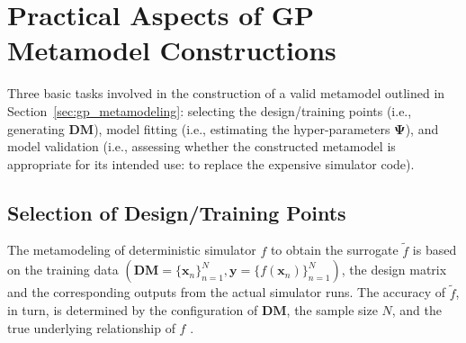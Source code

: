 \section{Practical Aspects of GP Metamodel Constructions}\label{sec:gp_construction}

Three basic tasks involved in the construction of a valid metamodel outlined in Section~\ref{sec:gp_metamodeling}:
selecting the design/training points (i.e., generating $\mathbf{DM}$),
model fitting (i.e., estimating the hyper-parameters $\boldsymbol{\Psi}$),
and model validation (i.e., assessing whether the constructed metamodel is appropriate for its intended use: to replace the expensive simulator code).

\subsection{Selection of Design/Training Points}\label{sub:gp_design}

The metamodeling of deterministic simulator $f$ to obtain the surrogate $\tilde{f}$ is based on the training data $\left(\mathbf{DM} = \{\mathbf{x}_n\}_{n=1}^N, \mathbf{y} = \{f(\mathbf{x}_{n})\}_{n=1}^N\right)$, 
the design matrix and the corresponding outputs from the actual simulator runs.
The accuracy of $\tilde{f}$, in turn, is determined by the configuration of $\mathbf{DM}$,
the sample size $N$, and the true underlying relationship of $f$ \cite{Ginsbourger2010}.

